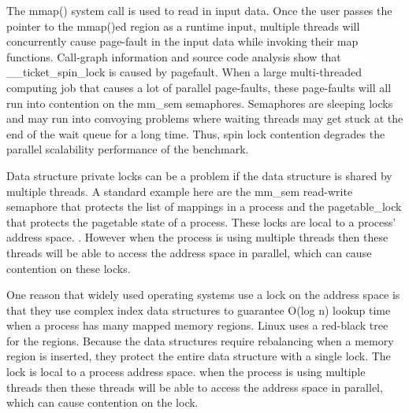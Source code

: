 
The mmap() system call is used to read in input data. 
Once the user passes the pointer to the mmap()ed region as a runtime input, 
multiple threads will concurrently cause page-fault in the input data
while invoking their map functions.
Call-graph information and source code analysis show that 
\_\_ticket\_spin\_lock is caused by pagefault.
When a large multi-threaded computing job 
that causes a lot of parallel page-faults, 
these page-faults will all run into contention on the mm\_sem semaphores.
Semaphores are sleeping locks 
and may run into convoying problems 
where waiting threads may 
get stuck at the end of the wait queue for a long time.\cite{Andi2009lmulticore}
Thus, spin lock 
contention degrades the parallel scalability performance of 
the benchmark. 

Data structure private locks can be a problem 
if the data structure is shared by multiple threads. 
A standard example here are the mm\_sem read-write semaphore 
that protects the list of mappings in a process and 
the pagetable\_lock that protects the pagetable state of a process. 
These locks are local to a process’ address space. 
. 
However when the process is using multiple threads 
then these threads will be able to access the address space in parallel,
which can cause contention on these locks.


One reason that widely used operating systems 
use a lock on the address space is 
that they use complex index data structures to guarantee O(log n)
lookup time when a process has many mapped memory
regions. Linux uses a red-black tree for the regions\cite{linux}. 
Because the data structures require rebalancing 
when a memory region is inserted, 
they protect the entire data structure with a single lock.
The lock is local to a process address space.
when the process is using multiple threads 
then these threads will be able to access
the address space in parallel, 
which can cause contention on the lock.

